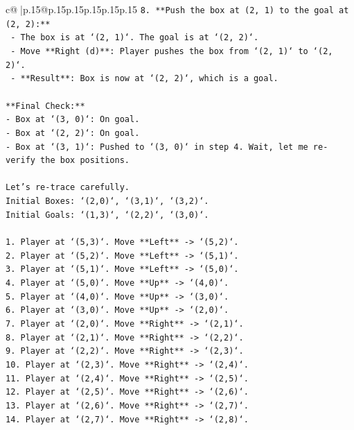 \documentclass{article}
\begin{document}
{\begin{supertabular}{c@{$\;$}|p{.15\linewidth}@{}p{.15\linewidth}p{.15\linewidth}p{.15\linewidth}p{.15\linewidth}p{.15\linewidth}}
{{{\texttt{8.  **Push the box at (2, 1) to the goal at (2, 2):**} \\
\texttt{    {-} The box is at `(2, 1)`. The goal is at `(2, 2)`.} \\
\texttt{    {-} Move **Right (d)**: Player pushes the box from `(2, 1)` to `(2, 2)`.} \\
\texttt{    {-} **Result**: Box is now at `(2, 2)`, which is a goal.} \\
\\ 
\texttt{**Final Check:**} \\
\texttt{{-} Box at `(3, 0)`: On goal.} \\
\texttt{{-} Box at `(2, 2)`: On goal.} \\
\texttt{{-} Box at `(3, 1)`: Pushed to `(3, 0)` in step 4. Wait, let me re{-}verify the box positions.} \\
\\ 
\texttt{Let's re{-}trace carefully.} \\
\texttt{Initial Boxes: `(2,0)`, `(3,1)`, `(3,2)`.} \\
\texttt{Initial Goals: `(1,3)`, `(2,2)`, `(3,0)`.} \\
\\ 
\texttt{1.  Player at `(5,3)`. Move **Left** {-}> `(5,2)`.} \\
\texttt{2.  Player at `(5,2)`. Move **Left** {-}> `(5,1)`.} \\
\texttt{3.  Player at `(5,1)`. Move **Left** {-}> `(5,0)`.} \\
\texttt{4.  Player at `(5,0)`. Move **Up** {-}> `(4,0)`.} \\
\texttt{5.  Player at `(4,0)`. Move **Up** {-}> `(3,0)`.} \\
\texttt{6.  Player at `(3,0)`. Move **Up** {-}> `(2,0)`.} \\
\texttt{7.  Player at `(2,0)`. Move **Right** {-}> `(2,1)`.} \\
\texttt{8.  Player at `(2,1)`. Move **Right** {-}> `(2,2)`.} \\
\texttt{9.  Player at `(2,2)`. Move **Right** {-}> `(2,3)`.} \\
\texttt{10. Player at `(2,3)`. Move **Right** {-}> `(2,4)`.} \\
\texttt{11. Player at `(2,4)`. Move **Right** {-}> `(2,5)`.} \\
\texttt{12. Player at `(2,5)`. Move **Right** {-}> `(2,6)`.} \\
\texttt{13. Player at `(2,6)`. Move **Right** {-}> `(2,7)`.} \\
\texttt{14. Player at `(2,7)`. Move **Right** {-}> `(2,8)`.} \\
}}}
\end{supertabular}}
\end{document}
